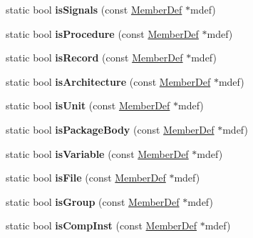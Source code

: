 \begin{DoxyCompactItemize}
static bool {\bfseries is\+Signals} (const \mbox{\hyperlink{class_member_def}{Member\+Def}} $\ast$mdef)
\item 
\mbox{\label{class_vhdl_doc_gen_aed906dd71cdcb8aca1bc6e3f9fba9732}} 
static bool {\bfseries is\+Procedure} (const \mbox{\hyperlink{class_member_def}{Member\+Def}} $\ast$mdef)
\item 
\mbox{\label{class_vhdl_doc_gen_ac0634a061165ad22c27eef2ac12057d0}} 
static bool {\bfseries is\+Record} (const \mbox{\hyperlink{class_member_def}{Member\+Def}} $\ast$mdef)
\item 
\mbox{\label{class_vhdl_doc_gen_a0281ffc4e374d27d703419ae289e3b8c}} 
static bool {\bfseries is\+Architecture} (const \mbox{\hyperlink{class_member_def}{Member\+Def}} $\ast$mdef)
\item 
\mbox{\label{class_vhdl_doc_gen_a4861484cc952d96afcfe277cf958aff0}} 
static bool {\bfseries is\+Unit} (const \mbox{\hyperlink{class_member_def}{Member\+Def}} $\ast$mdef)
\item 
\mbox{\label{class_vhdl_doc_gen_ab6e9aff43352b39d31806d0616e2c7af}} 
static bool {\bfseries is\+Package\+Body} (const \mbox{\hyperlink{class_member_def}{Member\+Def}} $\ast$mdef)
\item 
\mbox{\label{class_vhdl_doc_gen_a877e8a81695500e7ad5ed8d76fdbaffc}} 
static bool {\bfseries is\+Variable} (const \mbox{\hyperlink{class_member_def}{Member\+Def}} $\ast$mdef)
\item 
\mbox{\label{class_vhdl_doc_gen_a7ac9c26b1b0fb7402cc58acaf569df89}} 
static bool {\bfseries is\+File} (const \mbox{\hyperlink{class_member_def}{Member\+Def}} $\ast$mdef)
\item 
\mbox{\label{class_vhdl_doc_gen_a069c8ad206be372bd948cc8e964218ed}} 
static bool {\bfseries is\+Group} (const \mbox{\hyperlink{class_member_def}{Member\+Def}} $\ast$mdef)
\item 
\mbox{\label{class_vhdl_doc_gen_ab9e42b2cf2d969dcc943ec355d4fa6b2}} 
static bool {\bfseries is\+Comp\+Inst} (const \mbox{\hyperlink{class_member_def}{Member\+Def}} $\ast$mdef)

\end{DoxyCompactItemize}
